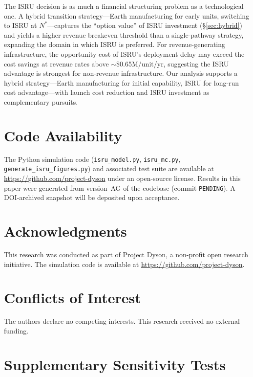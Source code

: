 \documentclass[preprint,12pt]{elsarticle}
\begin{document}
The ISRU decision is as much a financial structuring problem as a technological one. A hybrid transition strategy---Earth manufacturing for early units, switching to ISRU at $N^*$---captures the ``option value'' of ISRU investment (\S\ref{sec:hybrid}) and yields a higher revenue breakeven threshold than a single-pathway strategy, expanding the domain in which ISRU is preferred. For revenue-generating infrastructure, the opportunity cost of ISRU's deployment delay may exceed the cost savings at revenue rates above ${\sim}$\$0.65M/unit/yr, suggesting the ISRU advantage is strongest for non-revenue infrastructure. Our analysis supports a hybrid strategy---Earth manufacturing for initial capability, ISRU for long-run cost advantage---with launch cost reduction and ISRU investment as complementary pursuits.

\section*{Code Availability}

The Python simulation code (\texttt{isru\_model.py}, \texttt{isru\_mc.py}, \texttt{generate\_isru\_figures.py}) and associated test suite are available at \url{https://github.com/project-dyson} under an open-source license. Results in this paper were generated from version~AG of the codebase (commit \texttt{PENDING}). A DOI-archived snapshot will be deposited upon acceptance.


\section*{Acknowledgments}

This research was conducted as part of Project Dyson, a non-profit open research initiative. The simulation code is available at \url{https://github.com/project-dyson}.

\section*{Conflicts of Interest}

The authors declare no competing interests. This research received no external funding.

\appendix
\section{Supplementary Sensitivity Tests}
\label{sec:appendix_sensitivity}
\end{document}
